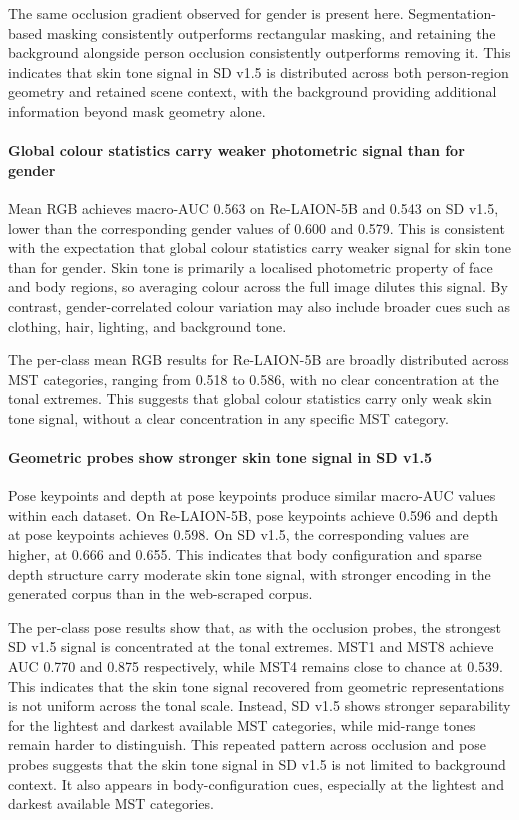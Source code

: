 The same occlusion gradient observed for gender is present here. Segmentation-based masking consistently outperforms rectangular masking, and retaining the background alongside person occlusion consistently outperforms removing it. This indicates that skin tone signal in SD v1.5 is distributed across both person-region geometry and retained scene context, with the background providing additional information beyond mask geometry alone.

\paragraph{Global colour statistics carry weaker photometric signal than for gender}

Mean RGB achieves macro-AUC 0.563 on Re-LAION-5B and 0.543 on SD v1.5, lower than the corresponding gender values of 0.600 and 0.579. This is consistent with the expectation that global colour statistics carry weaker signal for skin tone than for gender. Skin tone is primarily a localised photometric property of face and body regions, so averaging colour across the full image dilutes this signal. By contrast, gender-correlated colour variation may also include broader cues such as clothing, hair, lighting, and background tone.

The per-class mean RGB results for Re-LAION-5B are broadly distributed across MST categories, ranging from 0.518 to 0.586, with no clear concentration at the tonal extremes. This suggests that global colour statistics carry only weak skin tone signal, without a clear concentration in any specific MST category.

\paragraph{Geometric probes show stronger skin tone signal in SD v1.5}

Pose keypoints and depth at pose keypoints produce similar macro-AUC values within each dataset. On Re-LAION-5B, pose keypoints achieve 0.596 and depth at pose keypoints achieves 0.598. On SD v1.5, the corresponding values are higher, at 0.666 and 0.655. This indicates that body configuration and sparse depth structure carry moderate skin tone signal, with stronger encoding in the generated corpus than in the web-scraped corpus.

The per-class pose results show that, as with the occlusion probes, the strongest SD v1.5 signal is concentrated at the tonal extremes. MST1 and MST8 achieve AUC 0.770 and 0.875 respectively, while MST4 remains close to chance at 0.539. This indicates that the skin tone signal recovered from geometric representations is not uniform across the tonal scale. Instead, SD v1.5 shows stronger separability for the lightest and darkest available MST categories, while mid-range tones remain harder to distinguish. This repeated pattern across occlusion and pose probes suggests that the skin tone signal in SD v1.5 is not limited to background context. It also appears in body-configuration cues, especially at the lightest and darkest available MST categories.

